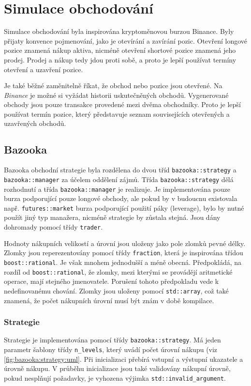 \chapter{Simulace obchodování}
Simulace obchodování byla inspirována kryptoměnovou burzou Binance.
Byly přijaty konvence pojmenování, jako je otevírání a zavírání pozic.
Otevření longové pozice znamená nákup aktiva, nicméně otevření shortové pozice znamená jeho prodej.
Prodej a nákup tedy jdou proti sobě, a proto je lepší používat termíny otevření a uzavření pozice.

Je také běžné zaměnitelně říkat, že obchod nebo pozice jsou otevřené.
Na \textit{Binance} je možné si vyžádat historii uskutečněných obchodů.
Vygenerované obchody jsou pouze transakce provedené mezi dvěma obchodníky.
Proto je lepší používat termín pozice, který představuje seznam souvisejících otevřených a uzavřených obchodů.

\section{Bazooka}
Bazooka obchodní strategie byla rozdělena do dvou tříd \texttt{bazooka::strategy} a \texttt{bazooka::manager} za účelem oddělení zájmů.
Třída \texttt{bazooka::strategy} dělá rozhodnutí a třída \texttt{bazooka::manager} je realizuje.
Je implementována pouze burza podporující pouze longové obchody, ale pokud by v budoucnu existovala např. \texttt{futures::market} burza podporující použití páky (leverage), bylo by nutné použít jiný typ manažera, nicméně strategie by zůstala stejná.
Jsou dány dohromady pomocí třídy \texttt{trader}.

Hodnoty nákupních velikostí a úrovní jsou uloženy jako pole zlomků pevné délky.
Zlomky jsou reperezentovány pomocí třídy \texttt{fraction}, která je inspirována třídou \texttt{boost::rational}.
Je však mnohem jednodušší a méně obecná.
Předpokládá, na rozdíl od \texttt{boost::rational}, že zlomky, mezi kterými se provádějí aritmetické operace, mají stejného jmenovatele.
Porušení tohoto předpokladu vede k nedefinovanému chování.
Zlomky jsou uloženy pomocí \texttt{std::array}, což také znamená, že počet nákupních úrovní musí být znám v době kompilace.

\subsection{Strategie}
Strategie je implementována pomocí třídy \texttt{bazooka::strategy}.
Má jeden parametr šablony třídy \texttt{n\_levels}, který uvádí počet úrovní nákupu (viz \ref{fig:bazooka:strategy:uml}.
Při inicializaci přebírá vstupní a výstupní ukazatele a úrovně nákupu.
V průběhu inicializace jsou také validovány nákupní úrovně, pokud nesplňují požadavky, je vyhozena výjimka \texttt{std::invalid\_argument}.

